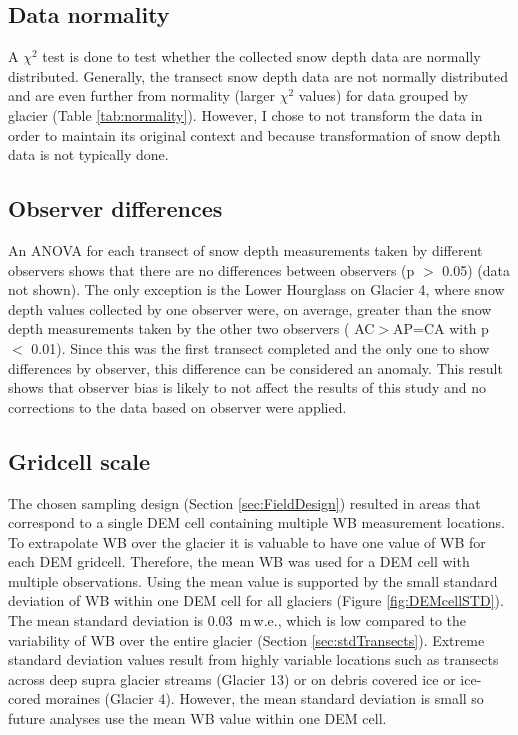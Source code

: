\documentclass{sfuthesis}
\begin{document}
\begin{appendices}
\subsection{Data normality}

A $\chi^2$ test is done to test whether the collected snow depth data are normally distributed. Generally, the transect snow depth data are not normally distributed and are even further from normality (larger $\chi^2$ values) for data grouped by glacier (Table \ref{tab:normality}). However, I chose to not transform the data in order to maintain its original context and because transformation of snow depth data is not typically done.  

\subsection{Observer differences}

An ANOVA for each transect of snow depth measurements taken by different observers shows that there are no differences between observers (p $>$ 0.05) (data not shown). The only exception is the Lower Hourglass on Glacier 4, where snow depth values collected by one observer were, on average, greater than the snow depth measurements taken by the other two observers ( AC$>$AP=CA with p $<$ 0.01). Since this was the first transect completed and the only one to show differences by observer, this difference can be considered an anomaly. This result shows that observer bias is likely to not affect the results of this study and no corrections to the data based on observer were applied.

\subsection{Gridcell scale}

The chosen sampling design (Section \ref{sec:FieldDesign}) resulted in areas that correspond to a single DEM cell containing multiple WB measurement locations. To extrapolate WB over the glacier it is valuable to have one value of WB for each DEM gridcell. Therefore, the mean WB was used for a DEM cell with multiple observations. Using the mean value is supported by the small standard deviation of WB within one DEM cell for all glaciers (Figure \ref{fig:DEMcellSTD}). The mean standard deviation is 0.03 \,m\,w.e., which is low compared to the variability of WB over the entire glacier (Section \ref{sec:stdTransects}). Extreme standard deviation values result from highly variable locations such as transects across deep supra glacier streams (Glacier 13) or on debris covered ice or ice-cored moraines (Glacier 4). However, the mean standard deviation is small so future analyses use the mean WB value within one DEM cell. 


\end{appendices}
\end{document}
